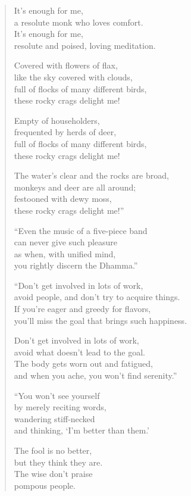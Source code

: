 \documentclass[12pt,openany]{book}%
\begin{document}
\begin{verse}
It’s enough for me, \\
a resolute monk who loves comfort. \\
It’s enough for me, \\
resolute and poised, loving meditation. 

Covered with flowers of flax, \\
like the sky covered with clouds, \\
full of flocks of many different birds, \\
these rocky crags delight me! 

Empty of householders, \\
frequented by herds of deer, \\
full of flocks of many different birds, \\
these rocky crags delight me! 

The water’s clear and the rocks are broad, \\
monkeys and deer are all around; \\
festooned with dewy moss, \\
these rocky crags delight me!” 

“Even the music of a five-piece band \\
can never give such pleasure \\
as when, with unified mind, \\
you rightly discern the Dhamma.” 

“Don’t get involved in lots of work, \\
avoid people, and don’t try to acquire things. \\
If you’re eager and greedy for flavors, \\
you’ll miss the goal that brings such happiness. 

Don’t get involved in lots of work, \\
avoid what doesn’t lead to the goal. \\
The body gets worn out and fatigued, \\
and when you ache, you won’t find serenity.” 

“You won’t see yourself \\
by merely reciting words, \\
wandering stiff-necked \\
and thinking, ‘I’m better than them.’ 

The fool is no better, \\
but they think they are. \\
The wise don’t praise \\
pompous people. 


\end{verse}
\end{document}
